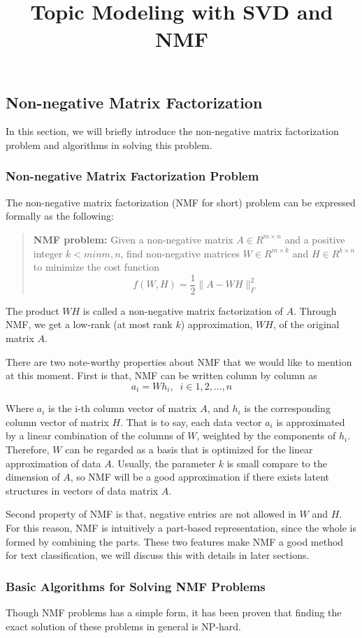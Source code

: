 \documentclass[12pt,letterpaper]{article}
\title{Topic Modeling with SVD and NMF}
\author{}
\begin{document}
\maketitle
\subsection{Non-negative Matrix Factorization} 
In this section, we will briefly introduce the non-negative matrix factorization problem and algorithms in solving this problem. 
\subsubsection{Non-negative Matrix Factorization Problem}
The non-negative matrix factorization (NMF for short) problem can be expressed formally as the following: 
\begin{quotation}
	\noindent \textbf{NMF problem:} Given a non-negative matrix $A\in R^{m\times n}$ and a positive integer $k < min{m, n}$, find non-negative matrices $W \in R^{m\times k}$ and $H \in R^{k \times n}$ to minimize the cost function
	\begin{equation}
	f(W, H) = \frac{1}{2}\|A-WH\|_F^2
	\end{equation} 
\end{quotation} 

The product $WH$ is called a non-negative matrix factorization of $A$. Through NMF, we get a low-rank (at most rank $k$) approximation, $WH$, of the original matrix $A$. 

There are two note-worthy properties about NMF that we would like to mention at this moment. First is that, NMF can be written column by column as
\begin{equation}
a_i = Wh_i, \;\; i \in {1, 2, ..., n}
\end{equation}

Where $a_i$ is the i-th column vector of matrix $A$, and $h_i$ is the corresponding column vector of matrix $H$. That is to say, each data vector $a_i$ is approximated by a linear combination of the columns of $W$, weighted by the components of $h_i$. Therefore, $W$ can be regarded as a basis that is optimized for the linear approximation of data $A$. Usually, the parameter $k$ is small compare to the dimension of $A$, so NMF will be a good approximation if there exists latent structures in vectors of data matrix $A$. 

Second property of NMF is that, negative entries are not allowed in $W$ and $H$. For this reason, NMF is intuitively a part-based representation, since the whole is formed by combining the parts. These two features make NMF a good method for text classification, we will discuss this with details in later sections. 
\subsubsection{Basic Algorithms for Solving NMF Problems}
Though NMF problems has a simple form, it has been proven that finding the exact solution of these problems in general is NP-hard. 
\end{document}
